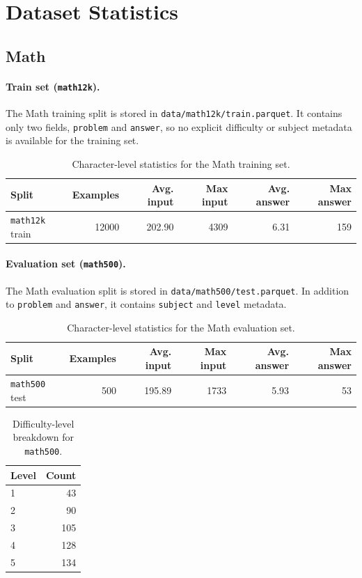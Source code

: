 \section{Dataset Statistics}

\subsection{Math}

\paragraph{Train set (\texttt{math12k}).}
The Math training split is stored in \texttt{data/math12k/train.parquet}. It contains only two fields, \texttt{problem} and \texttt{answer}, so no explicit difficulty or subject metadata is available for the training set.

\begin{table}[h]
\centering
\begin{tabular}{lrrrrr}
\hline
Split & Examples & Avg. input & Max input & Avg. answer & Max answer \\
\hline
\texttt{math12k} train & 12000 & 202.90 & 4309 & 6.31 & 159 \\
\hline
\end{tabular}
\caption{Character-level statistics for the Math training set.}
\end{table}

\paragraph{Evaluation set (\texttt{math500}).}
The Math evaluation split is stored in \texttt{data/math500/test.parquet}. In addition to \texttt{problem} and \texttt{answer}, it contains \texttt{subject} and \texttt{level} metadata.

\begin{table}[h]
\centering
\begin{tabular}{lrrrrr}
\hline
Split & Examples & Avg. input & Max input & Avg. answer & Max answer \\
\hline
\texttt{math500} test & 500 & 195.89 & 1733 & 5.93 & 53 \\
\hline
\end{tabular}
\caption{Character-level statistics for the Math evaluation set.}
\end{table}

\begin{table}[h]
\centering
\begin{tabular}{lr}
\hline
Level & Count \\
\hline
1 & 43 \\
2 & 90 \\
3 & 105 \\
4 & 128 \\
5 & 134 \\
\hline
\end{tabular}
\caption{Difficulty-level breakdown for \texttt{math500}.}
\end{table}

